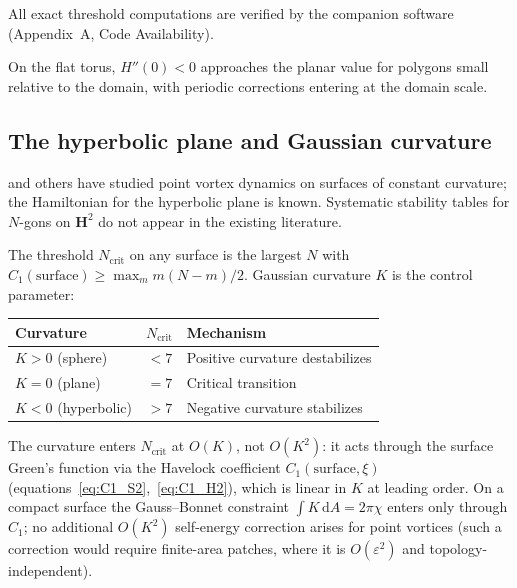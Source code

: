 \noindent
All exact threshold computations are verified by the companion
software (Appendix~A, Code Availability).

On the flat torus, $H''(0) < 0$ approaches the planar value for
polygons small relative to the domain, with periodic corrections
entering at the domain scale.

\subsection{The hyperbolic plane and Gaussian curvature}
\label{sec:hyperbolic}

\citet{Kimura1999} and others have studied point vortex dynamics on
surfaces of constant curvature; the Hamiltonian for the hyperbolic plane
is known.  Systematic stability tables for $N$-gons on $\mathbf{H}^2$
do not appear in the existing literature.

The threshold $N_{\mathrm{crit}}$ on any surface is the largest $N$
with $C_1(\text{surface}) \ge \max_m m(N{-}m)/2$.
Gaussian curvature $K$ is the control parameter:
\begin{center}
\begin{tabular}{lcl}
\toprule
Curvature & $N_{\mathrm{crit}}$ & Mechanism \\
\midrule
$K > 0$ (sphere) & $< 7$ & Positive curvature destabilizes \\
$K = 0$ (plane) & $= 7$ & Critical transition \\
$K < 0$ (hyperbolic) & $> 7$ & Negative curvature stabilizes \\
\bottomrule
\end{tabular}
\end{center}
\begin{remark}
\label{rem:euler}
The curvature enters $N_{\mathrm{crit}}$ at $O(K)$, not $O(K^2)$:
it acts through the surface Green's function via the Havelock
coefficient $C_1(\text{surface},\xi)$
(equations~\eqref{eq:C1_S2},~\eqref{eq:C1_H2}), which is linear
in $K$ at leading order.  On a compact surface the Gauss--Bonnet
constraint $\int K\,\mathrm{d}A = 2\pi\chi$ enters only through
$C_1$; no additional $O(K^2)$ self-energy correction arises for
point vortices (such a correction would require finite-area patches,
where it is $O(\varepsilon^2)$ and topology-independent).
\end{remark}

